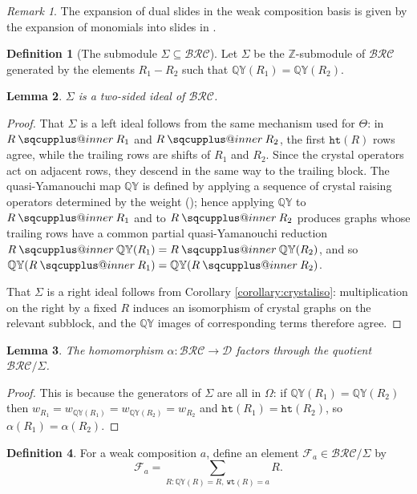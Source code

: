 \documentclass{amsart}
\makeatletter
\newcommand{\sqcupplus@inner}[2]{%
  \vcenter{\hbox{\ooalign{%
    \hfil$\m@th#1\sqcup$\hfil\cr
    \hfil\raisebox{0.15ex}{$\m@th#1\scriptscriptstyle+$}\hfil\cr
  }}}%
}
\newcommand{\sqcupplus}{\mathbin{\mathpalette\sqcupplus@inner\relax}}
\newtheorem{lemma}{Lemma}[subsection]
\theoremstyle{definition}
\newtheorem{definition}[lemma]{Definition}
\theoremstyle{remark}
\newtheorem*{remark}{Remark}
\numberwithin{equation}{subsection}
\newcommand{\wof}[1]{w_{#1}}
\newcommand{\wtt}{\mathtt{wt}}
\newcommand{\QY}{\ensuremath{\mathbb{QY}}}
\newcommand{\hr}{\mathtt{ht}}
\newcommand{\BRC}{\mathcal{BRC}}
\newcommand{\dcoma}{\mathcal{D}}
\makeatother
\begin{document}
\begin{remark}
The expansion of dual slides in the weak composition basis is given by the expansion of monomials into slides in \cite[Theorem~5.2]{nadeau2024ppartitions}.
\end{remark}

\begin{definition}[The submodule $\Sigma\subseteq \BRC$]
Let $\Sigma$ be the $\mathbb{Z}$-submodule of $\BRC$ generated by the elements $R_1-R_2$ such that $\QY(R_1)=\QY(R_2)$.
\end{definition}

\begin{lemma}\label{lemma:slideideal}
$\Sigma$ is a two-sided ideal of $\BRC$.
\end{lemma}
\begin{proof}
That $\Sigma$ is a left ideal follows from the same mechanism used for $\Theta$: in $R\sqcupplus R_1$ and $R\sqcupplus R_2$, the first $\hr(R)$ rows agree, while the trailing rows are shifts of $R_1$ and $R_2$. Since the crystal operators act on adjacent rows, they descend in the same way to the trailing block. The quasi-Yamanouchi map $\QY$ is defined by applying a sequence of crystal raising operators determined by the weight (\cite{assaf2017slide}); hence applying $\QY$ to $R\sqcupplus R_1$ and to $R\sqcupplus R_2$ produces graphs whose trailing rows have a common partial quasi-Yamanouchi reduction $R\sqcupplus \QY(R_1)=R\sqcupplus \QY(R_2)$, and so $\QY(R\sqcupplus R_1)=\QY(R\sqcupplus R_2)$.

That $\Sigma$ is a right ideal follows from Corollary \ref{corollary:crystaliso}: multiplication on the right by a fixed $R$ induces an isomorphism of crystal graphs on the relevant subblock, and the $\QY$ images of corresponding terms therefore agree.
\end{proof}

\begin{lemma}
The homomorphism $\alpha:\BRC\to\dcoma$ factors through the quotient $\BRC/\Sigma$.
\end{lemma}
\begin{proof}
This is because the generators of $\Sigma$ are all in $\Omega$: if $\QY(R_1)=\QY(R_2)$ then $\wof{R_1}=\wof{\QY(R_1)}=\wof{\QY(R_2)}=\wof{R_2}$ and $\hr(R_1)=\hr(R_2)$, so $\alpha(R_1)=\alpha(R_2)$.
\end{proof}

\begin{definition}
For a weak composition $a$, define an element $\mathcal{F}_a\in\BRC/\Sigma$ by
$$\mathcal{F}_a=\sum_{R: \QY(R)=R,\ \wtt(R)=a} R.$$
\end{definition}
\end{document}
